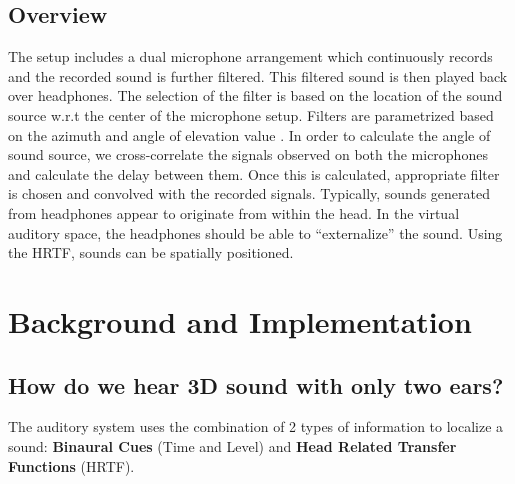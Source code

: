 \documentclass[BTech]{nitkdiss}
\begin{document}
\section{Overview}          
The setup includes a dual microphone arrangement which continuously records and the recorded sound is further filtered. This filtered sound is then played back over headphones. The selection of the filter is based on the location of the sound source w.r.t the center of the microphone setup. Filters are parametrized based on the azimuth and angle of elevation value . \newline
In order to calculate the angle of sound source, we cross-correlate the signals observed on both the microphones and calculate the delay between them. Once this is calculated, appropriate filter is chosen and convolved with the recorded signals. Typically, sounds generated from headphones appear to originate from within the head. In the virtual auditory space, the headphones should be able to “externalize” the sound. Using the HRTF, sounds can be spatially positioned.

\chapter{Background and Implementation}
\section{How do we hear 3D sound with only two ears?}
The auditory system uses the combination of 2 types of information to localize a sound: \textbf{Binaural Cues} (Time and Level) and \textbf{Head Related Transfer Functions} (HRTF).
\end{document}
